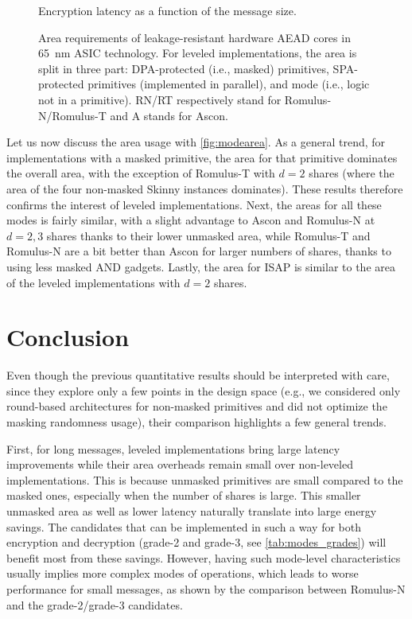\documentclass{llncs}
\begin{document}
\begin{figure}
    \centering
    
    \caption{Encryption latency as a function of the message size.}
    \label{fig:modelatency}
\end{figure}

\begin{figure}
    \centering
    
    \caption{%
        Area requirements of leakage-resistant hardware AEAD cores in
        \SI{65}{nm} ASIC technology.
        For leveled implementations, the area is split in three part:
        DPA-protected (i.e., masked) primitives, SPA-protected primitives (implemented in parallel), and mode (i.e., logic not in a primitive).
				RN/RT respectively stand for Romulus-N/Romulus-T and A stands for Ascon.
    }
    \label{fig:modearea}
\end{figure}


Let us now discuss the area usage with \autoref{fig:modearea}.
As a general trend, for implementations with a masked primitive, the area for
that primitive dominates the overall area, with the exception of Romulus-T with
$d=2$ shares (where the area of the four non-masked Skinny instances dominates).
These results therefore confirms the interest of leveled implementations.
Next, the areas for all these modes is fairly similar, with a slight advantage
to Ascon and Romulus-N at $d=2,3$ shares thanks to their lower unmasked area, while
Romulus-T and Romulus-N are a bit better than Ascon for larger numbers of
shares, thanks to using less masked AND gadgets.
Lastly, the area for ISAP is similar to the area of the leveled implementations
with $d=2$ shares.

\section{Conclusion}

Even though the previous quantitative results should be interpreted with care, since
they explore only a few points in the design space (e.g., we considered only
round-based architectures for non-masked primitives and did not optimize the
masking randomness usage), their comparison highlights a few general trends.

\smallskip

First, for long messages, leveled implementations bring large latency
improvements while their area overheads remain small over non-leveled
implementations. This is because unmasked primitives are small compared to the masked
ones, especially when the number of shares is large.
This smaller unmasked area as well as lower latency naturally translate
into large energy savings.
The candidates that can be implemented in such a way for both
encryption and decryption (grade-2 and grade-3, see
\autoref{tab:modes_grades}) will benefit most from these savings.
However, having such mode-level characteristics usually implies more complex
modes of operations, which leads to worse performance for small messages, as
shown by the comparison between Romulus-N and the grade-2/grade-3 candidates.
\end{document}
